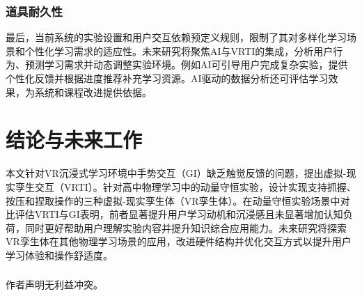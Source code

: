 \documentclass[runningheads]{llncs}
\begin{document}
\subsubsection{道具耐久性}
最后，当前系统的实验设置和用户交互依赖预定义规则，限制了其对多样化学习场景和个性化学习需求的适应性。未来研究将聚焦AI与VRTI的集成，分析用户行为、预测学习需求并动态调整实验环境。例如AI可引导用户完成复杂实验，提供个性化反馈并根据进度推荐补充学习资源。AI驱动的数据分析还可评估学习效果，为系统和课程改进提供依据。

\section{结论与未来工作}
本文针对VR沉浸式学习环境中手势交互（GI）缺乏触觉反馈的问题，提出虚拟-现实孪生交互（VRTI）。针对高中物理学习中的动量守恒实验，设计实现支持抓握、按压和捏取操作的三种虚拟-现实孪生体（VR孪生体）。在动量守恒实验场景中对比评估VRTI与GI表明，前者显著提升用户学习动机和沉浸感且未显著增加认知负荷，同时更好帮助用户理解实验内容并提升知识综合应用能力。未来研究将探索VR孪生体在其他物理学习场景的应用，改进硬件结构并优化交互方式以提升用户学习体验和操作舒适度。

\begin{credits}
\subsubsection{\ackname} 

\subsubsection{\discintname}
作者声明无利益冲突。
\end{credits}



\end{document}
